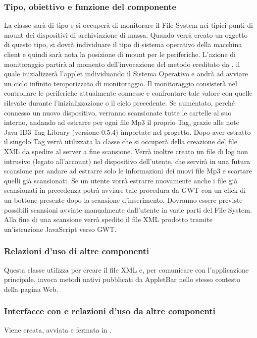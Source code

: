 \subsubsection*{Tipo, obiettivo e funzione del componente} La classe
 sar\`a di tipo  e si occuper\`a di monitorare il
File System nei tipici punti di mount dei dispositivi di archiviazione di massa.
Quando verr\`a creato un oggetto di questo tipo, si dovr\`a individuare il tipo
di sistema operativo della macchina client e quindi sar\`a nota la posizione di
mount per le periferiche. L'azione di monitoraggio partir\`a al momento
dell'invocazione del metodo  ereditato da , il quale
inizializzer\`a l'applet individuando il Sistema Operativo e andr\`a ad avviare
un ciclo infinito temporizzato di monitoraggio. Il monitoraggio consister\`a nel
controllare le periferiche attualmente connesse e confrontare tale valore con
quelle rilevate durante l'inizializzazione o il ciclo precedente. Se aumentato,
perch\'e connesso un nuovo dispositivo, verranno scansionate tutte le cartelle
al suo interno, andando ad estrarre per ogni file Mp3 il proprio Tag, grazie
alle note Java ID3 Tag Library (versione 0.5.4) importate nel progetto. Dopo
aver estratto il singolo Tag verr\`a utilizzata la classe  che
si occuper\`a della creazione del file XML da spedire al server a fine
scansione. Verr\`a inoltre creato un file di log non intrusivo (legato
all'account) nel dispositivo dell'utente, che servir\`a in una futura scansione
per andare ad estrarre solo le informazioni dei nuovi file Mp3 e scartare quelli
gi\`a scansionati. Se un utente vorr\`a estrarre nuovamente anche i file gi\`a
scansionati in precedenza potr\`a avviare tale procedura da GWT con un click di
un bottone presente dopo la scansione d'inserimento. Dovranno essere previste
possibili scansioni avviate manualmente dall'utente in varie parti del File
System. Alla fine di una scansione verr\`a spedito il file XML prodotto tramite
un'istruzione JavaScript verso GWT.

\subsubsection*{Relazioni d'uso di altre componenti}
Questa classe utilizza  per creare il file XML e, per
comunicare con l'applicazione principale, invoca metodi nativi pubblicati da
AppletBar nello stesso contesto della pagina Web.

\subsubsection*{Interfacce con e relazioni d'uso da altre componenti}
Viene creata, avviata e fermata in .

